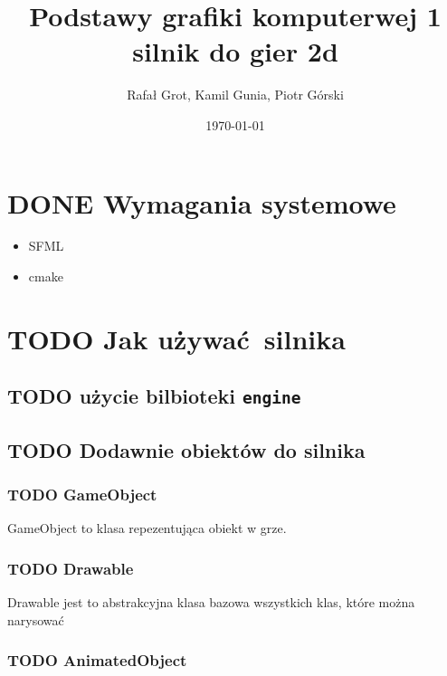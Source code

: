 \documentclass[11pt]{article}
\author{Rafał Grot, Kamil Gunia, Piotr Górski}
\date{\today}
\title{Podstawy grafiki komputerwej 1 silnik do gier 2d}
\begin{document}
\maketitle
\tableofcontents

\newpage
\section{{\bfseries\sffamily DONE} Wymagania systemowe}
\label{sec:orgb63ae14}
\begin{itemize}
\item SFML
\item cmake
\end{itemize}
\section{{\bfseries\sffamily TODO} Jak używać silnika}
\label{sec:orge06f6c1}
\subsection{{\bfseries\sffamily TODO} użycie bilbioteki \texttt{engine}}
\label{sec:org6b00b3a}
\subsection{{\bfseries\sffamily TODO} Dodawnie obiektów do silnika}
\label{sec:org6e73772}
\subsubsection{{\bfseries\sffamily TODO} GameObject}
\label{sec:org9174d34}
GameObject to klasa repezentująca obiekt w grze.
\subsubsection{{\bfseries\sffamily TODO} Drawable}
\label{sec:org9cebd53}
Drawable jest to abstrakcyjna klasa bazowa wszystkich klas, które można narysować
\subsubsection{{\bfseries\sffamily TODO} AnimatedObject}
\label{sec:orga1f3cea}
\end{document}
